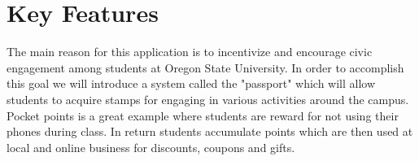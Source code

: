 \documentclass[letterpaper, 10pt, titlepage, fleqn, onecolumn]{article}
\begin{document}
\section{Key Features}

The main reason for this application is to incentivize and encourage civic engagement among students at Oregon State University. In order to accomplish this goal we will introduce a system called the "passport" which will allow students to acquire stamps for engaging in various activities around the campus. Pocket points \cite{pocketpoints} is a great example where students are reward for not using their phones during class. In return students accumulate points which are then used at local and online business for discounts, coupons and gifts.  \\


\newpage


\end{document}
